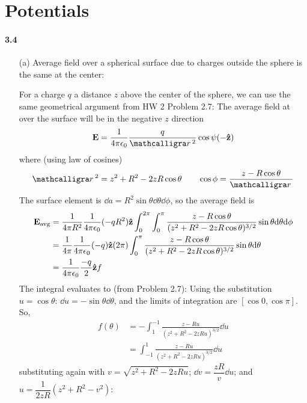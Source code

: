 \documentclass[../main.tex]{subfiles}
\begin{document}
\section{Potentials}
\barh 

\paragraph{3.4} 
\begin{enumerate}
    \item [(a)] Average field over a spherical surface due to charges outside the sphere is the same at the center:

    For a charge $q$ a distance $z$ above the center of the sphere, 
    we can use the same geometrical argument from HW 2 Problem 2.7:
    The average field at over the surface will be in the negative $z$ direction
    \begin{align*}
        \vb E = \ke \frac{q}{\scriptr^2} \cos\psi (-\vu z)
    \end{align*}
    where (using law of cosines)
    \begin{align*}
        \scriptr^2 = z^2 + R^2 - 2zR\cos\theta \qquad \cos\phi = \frac{z - R\cos\theta}{\scriptr}
    \end{align*}
    The surface element is $\dd a = R^2 \sin\theta \dd \theta \dd\phi$, so the average field is 
    \begin{align*}
        \vb E_\text{avg} &= \frac{1}{4\pi R^2} \frac{1}{4\pi\epsilon_0} (-qR^2) \vu z \int_0^{2\pi} \int_0^\pi \frac{z - R\cos\theta}{(z^2 + R^2 - 2zR\cos\theta)^{3/2}} \sin \theta \dd\theta \dd\phi \\
        &= \frac{1}{4\pi} \frac{1}{4\pi\epsilon_0} (-q) \vu z (2\pi) \int_0^\pi \frac{z - R\cos\theta}{(z^2 + R^2 - 2zR\cos\theta)^{3/2}} \sin \theta \dd\theta \\
        &= \frac{1}{4\pi\epsilon_0} \frac{-q}{2} \vu z f
    \end{align*}
    The integral evaluates to (from Problem 2.7):
    Using the substitution $u = \cos\theta$: $\dd{u} = -\sin\theta \dd{\theta}$, and the limits of
    integration are $[\cos{0}, \cos{\pi}]$. So,
    \begin{align*}
        f(\theta) &= -\int_{1}^{-1} \frac{z - Ru}{(z^2 + R^2 - 2zRu)^{3/2}} \dd{u} \\
        &= \int_{-1}^{1} \frac{z - Ru}{(z^2 + R^2 - 2zRu)^{3/2}} \dd{u}
    \end{align*}
    substituting again with $v = \sqrt{z^2 + R^2 - 2zRu}$; $\dd{v} = \dfrac{zR}{v} \dd{u}$; and $
    u = \dfrac{1}{2zR}(z^2 + R^2 - v^2)$:

\end{enumerate}
\end{document}
